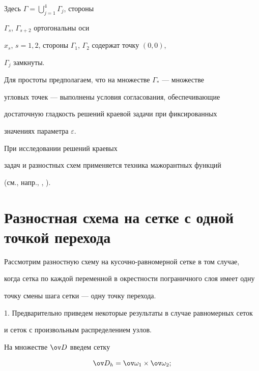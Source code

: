 Здесь $\varGamma=\bigcup\limits^4_{j=1} \varGamma_j$, стороны


$\varGamma_s$, $\varGamma_{s+2}$ ортогональны оси


$x_s$, $s=1,2$, стороны $\varGamma_1$, $\varGamma_2$ содержат точку $(0,0)$,


$\varGamma_j$ замкнуты.





Для простоты предполагаем, что на множестве $\varGamma_*$ --- множестве 


угловых точек --- выполнены условия согласования, обеспечивающие


достаточную гладкость решений краевой задачи при фиксированных


значениях параметра $\varepsilon$.





При исследовании решений краевых


задач и разностных схем применяется техника мажорантных функций


(см., напр., \cite{2}, \cite{18}).


\addtocounter{footnote}{-1}





\section{Разностная схема на сетке с одной точкой перехода}


\label{section.3}





Рассмотрим разностную схему на кусочно-равномерной сетке в том случае,


когда сетка по каждой переменной в окрестности пограничного слоя имеет одну


точку смены шага сетки --- одну точку перехода.





1. Предварительно приведем некоторые результаты в случае равномерных сеток


и сеток с произвольным распределением узлов.





На множестве $\ov D$ введем сетку


\begin{equation} \label{eq.3.1}


\ov D_h=\ov\omega_1\times \ov\omega_2;


\end{equation}


